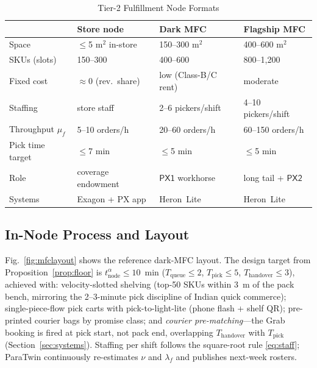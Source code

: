\documentclass[journal]{IEEEtran}
\begin{document}
\begin{table}[!t]
\caption{Tier-2 Fulfillment Node Formats}
\label{tab:formats}
\centering
\scriptsize
\begin{tabularx}{\columnwidth}{@{}l l l l@{}}
\toprule
& \textbf{Store node} & \textbf{Dark MFC} & \textbf{Flagship MFC} \\
\midrule
Space & $\le$5 m$^2$ in-store & 150--300 m$^2$ & 400--600 m$^2$ \\
SKUs (slots) & 150--300 & 400--600 & 800--1{,}200 \\
Fixed cost & $\approx$0 (rev.\ share) & low (Class-B/C rent) & moderate \\
Staffing & store staff & 2--6 pickers/shift & 4--10 pickers/shift \\
Throughput $\mu_f$ & 5--10 orders/h & 20--60 orders/h & 60--150 orders/h \\
Pick time target & $\le$7 min & $\le$5 min & $\le$5 min \\
Role & coverage endowment & $\mathsf{PX1}$ workhorse & long tail + $\mathsf{PX2}$ \\
Systems & Exagon + PX app & Heron~Lite & Heron~Lite \\
\bottomrule
\end{tabularx}
\end{table}

\subsection{In-Node Process and Layout}
Fig.~\ref{fig:mfclayout} shows the reference dark-MFC layout. The design target from Proposition~\ref{prop:floor} is $t^{\alpha}_{\mathrm{node}} \le 10$~min ($T_{\mathrm{queue}} \le 2$, $T_{\mathrm{pick}} \le 5$, $T_{\mathrm{handover}} \le 3$), achieved with: velocity-slotted shelving (top-50 SKUs within 3~m of the pack bench, mirroring the 2--3-minute pick discipline of Indian quick commerce); single-piece-flow pick carts with pick-to-light-lite (phone flash + shelf QR); pre-printed courier bags by promise class; and \emph{courier pre-matching}---the Grab booking is fired at pick start, not pack end, overlapping $T_{\mathrm{handover}}$ with $T_{\mathrm{pick}}$ (Section~\ref{sec:systems}). Staffing per shift follows the square-root rule \eqref{eq:staff}; ParaTwin continuously re-estimates $\nu$ and $\lambda_f$ and publishes next-week rosters.
\end{document}
